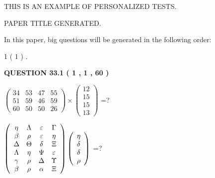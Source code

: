 \documentclass[12pt]{article}
\begin{document}
   
   
   
   
   
 \vspace{0.2in}
{\Huge  THIS IS AN EXAMPLE OF}
{\Huge  PERSONALIZED TESTS. }
   
   
 PAPER TITLE GENERATED.
   
   
   
\vspace{0.2in}
   
In this paper, big questions will be generated in the following order: 
   
   
   1 ( 1 )
 .
  
\vspace{0.2in}
  
{\textbf{\Large{QUESTION
33.1 
 ( 1 , 1 , 60 )
}}}
  
  
 
$ \left( \begin{array}{ccccccccc}
 34  & 
 53  & 
 47  & 
 55  \\ 
 51  & 
 59  & 
 46  & 
 59  \\ 
 60  & 
 50  & 
 50  & 
 26
\end{array}\right) \times
\left( \begin{array}{c}
 12  \\ 
 15  \\ 
 15  \\ 
 13
\end{array}\right) $ =?
 
 
$  %
 \left( \begin{array}
 {
 c
 c
 c
 c
 }
 \eta & 
 \Lambda & 
 \varepsilon & 
 \Gamma \\ 
 \beta & 
 \rho & 
 \varepsilon & 
 \eta \\ 
 \Delta & 
 \Theta & 
 \delta & 
                    \Xi \\ 
 \Lambda & 
 \eta & 
 \Psi & 
 \varepsilon \\ 
 \gamma & 
 \rho & 
 \Delta & 
 \Upsilon \\ 
 \beta & 
 \rho & 
 \alpha & 
                    \Xi
 \end{array} \right)
 \left( \begin{array}
 {
 c
 }
 \eta \\ 
 \delta \\ 
 \delta \\ 
 \rho
 \end{array} \right)
$ =?
 
 
 
\noindent{}
 
\end{document}
